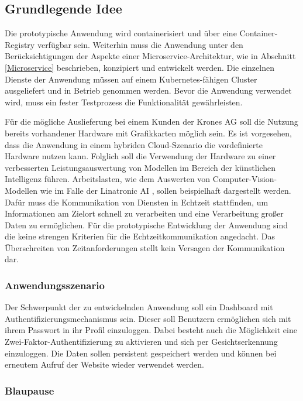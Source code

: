 \subsection{Grundlegende Idee}\label{idee}

Die prototypische Anwendung wird containerisiert und über eine Container-Registry verfügbar sein. 
Weiterhin muss die Anwendung unter den Berücksichtigungen der Aspekte einer Microservice-Architektur, wie in Abschnitt \ref{Microservice} beschrieben, konzipiert und entwickelt werden. 
Die einzelnen Dienste der Anwendung müssen auf einem Kubernetes-fähigen Cluster ausgeliefert und in Betrieb genommen werden.
Bevor die Anwendung verwendet wird, muss ein fester Testprozess die Funktionalität gewährleisten.

Für die mögliche Auslieferung bei einem Kunden der Krones AG soll die Nutzung bereits vorhandener Hardware mit Grafikkarten möglich sein. 
Es ist vorgesehen, dass die Anwendung in einem hybriden Cloud-Szenario die vordefinierte Hardware nutzen kann. 
Folglich soll die Verwendung der Hardware zu einer verbesserten Leistungsauswertung von Modellen im Bereich der künstlichen Intelligenz führen. 
Arbeitslasten, wie dem Auswerten von Computer-Vision-Modellen wie im Falle der Linatronic AI \cite{linatronic}, sollen beispielhaft dargestellt werden. 
Dafür muss die Kommunikation von Diensten in Echtzeit stattfinden, um Informationen am Zielort schnell zu verarbeiten und eine Verarbeitung großer Daten zu ermöglichen.
Für die prototypische Entwicklung der Anwendung sind die keine strengen Kriterien für die Echtzeitkommunikation angedacht.
Das Überschreiten von Zeitanforderungen stellt kein Versagen der Kommunikation dar.


\subsubsection{Anwendungsszenario}\label{Anwendungsszenario}

Der Schwerpunkt der zu entwickelnden Anwendung soll ein Dashboard mit Authentifizierungsmechanismus sein. 
Dieser soll Benutzern ermöglichen sich mit ihrem Passwort in ihr Profil einzuloggen. 
Dabei besteht auch die Möglichkeit eine Zwei-Faktor-Authentifizierung zu aktivieren und sich per Gesichtserkennung einzuloggen.
Die Daten sollen persistent gespeichert werden und können bei erneutem Aufruf der Website wieder verwendet werden. 

\subsubsection{Blaupause}

